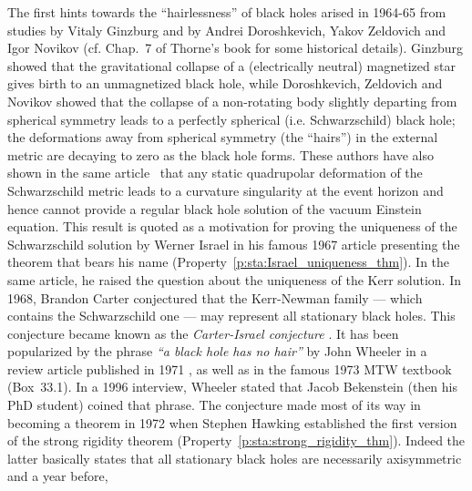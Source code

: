 \begin{hist}
The first hints towards the ``hairlessness'' of black holes arised in 1964-65 from
studies by Vitaly Ginzburg \cite{Ginzb64}
and by Andrei Doroshkevich, Yakov Zeldovich and Igor Novikov \cite{DorosZN65}
(cf.  Chap.~7 of Thorne's book \cite{Thorn94} for
some historical details).
Ginzburg showed that the gravitational collapse of a (electrically neutral) magnetized
star gives birth to an unmagnetized black hole, while
Doroshkevich, Zeldovich and Novikov showed
that the collapse of a non-rotating body slightly departing from spherical symmetry leads to a perfectly spherical (i.e. Schwarzschild) black hole;
the deformations away from spherical symmetry (the ``hairs'') in the external metric
are decaying to zero as the black hole forms. These authors have also shown in the same article~\cite{DorosZN65} that any static quadrupolar
deformation of the Schwarzschild metric leads to a curvature singularity at the event horizon and hence cannot provide a regular black hole
solution of the vacuum Einstein equation.
This result is quoted as a motivation for proving the uniqueness of the Schwarzschild
solution by Werner Israel
in his famous 1967 article \cite{Israe67} presenting the theorem that bears his name
(Property~\ref{p:sta:Israel_uniqueness_thm}). In the same article, he raised
the question about the uniqueness of the Kerr solution.
In 1968, Brandon Carter \cite{Carte68a}
conjectured that the Kerr-Newman family --- which contains the Schwarzschild one ---
may represent all stationary black holes.
This conjecture became known as the
\emph{Carter-Israel conjecture} \cite{Robin09,HawkiE73}.
It has been popularized by the phrase
\emph{``a black hole has no hair''} by
John Wheeler
in a review article published in 1971 \cite{RuffiW71},
as well as in the famous 1973 MTW textbook \cite{MisneTW73}
(Box~33.1). In a 1996 interview, Wheeler \cite{Wheel96} stated that Jacob Bekenstein (then his PhD student) coined that phrase.
The conjecture made most of its way in becoming a theorem in 1972 when Stephen Hawking \cite{Hawki72} established the first version of the strong rigidity theorem
(Property~\ref{p:sta:strong_rigidity_thm}). Indeed the latter basically states that all stationary black holes are necessarily axisymmetric and a year before,

\end{hist}
